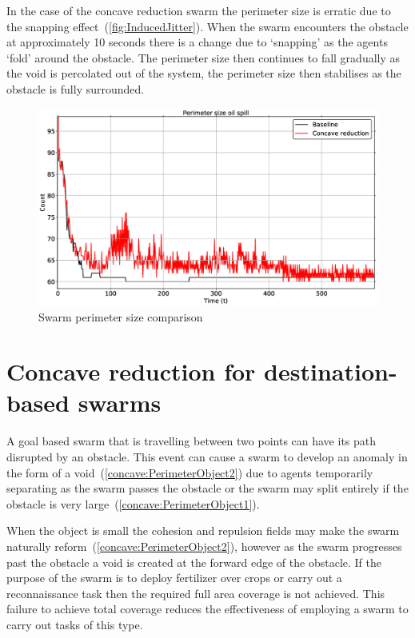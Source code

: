 In the case of the concave reduction swarm the perimeter size is erratic due to the snapping effect~(\autoref{fig:InducedJitter}). When the swarm encounters the obstacle at approximately 10 seconds there is a change due to `snapping' as the agents `fold' around the obstacle. The perimeter size then continues to fall gradually as the void is percolated out of the system, the perimeter size then stabilises as the obstacle is fully surrounded.
\begin{figure}[H]
\begin{center}
\includegraphics[width=14cm]{CHAPTER-7/figures/OilSpillPerimeter8060-1}
\end{center}
\caption{Swarm perimeter size comparison\label{concave:OilSpillPerimeter8060-1}}
\end{figure}

\section{Concave reduction for destination-based swarms}\label{concave:mobileSwarm1}
A goal based swarm that is travelling between two points can have its path disrupted by an obstacle. This event can cause a swarm to develop an anomaly in the form of a void~(\autoref{concave:PerimeterObject2}) due to agents temporarily separating as the swarm passes the obstacle or the swarm may split entirely if the obstacle is very large~(\autoref{concave:PerimeterObject1}). 

When the object is small the cohesion and repulsion fields may make the swarm naturally reform~(\autoref{concave:PerimeterObject2}), however as the swarm progresses past the obstacle a void is created at the forward edge of the obstacle. If the purpose of the swarm is to deploy fertilizer over crops or carry out a reconnaissance task then the required full area coverage is not achieved. This failure to achieve total coverage reduces the effectiveness of employing a swarm to carry out tasks of this type.

